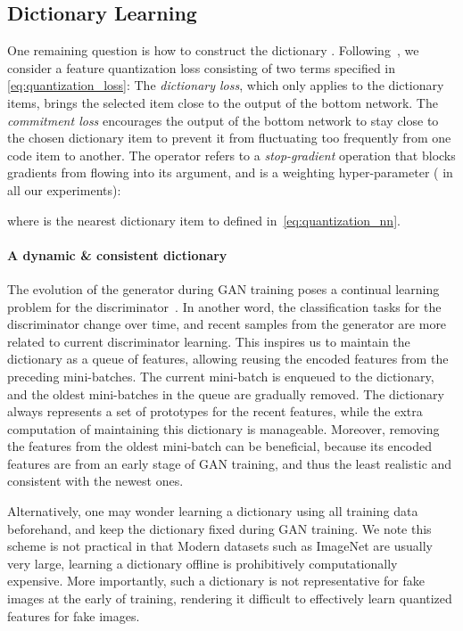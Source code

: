 \documentclass{article}
\begin{document}
\subsection{Dictionary Learning}
One remaining question is how to construct the dictionary . Following~\citep{van2017neural}, we consider a feature quantization loss consisting of two terms specified in \eqref{eq:quantization_loss}: 
 The {\it dictionary loss}, which only applies to the dictionary items, brings the selected item  close to the output of the bottom network. 
 The {\it commitment loss} encourages the output of the bottom network to stay close to the chosen dictionary item to prevent it from fluctuating too frequently from one code item to another. The operator  refers to a {\it stop-gradient} operation that blocks gradients from flowing into its argument, and  is a weighting hyper-parameter ( in all our experiments):

where  is the nearest dictionary item to  defined in~\eqref{eq:quantization_nn}. 

\paragraph{A dynamic \& consistent dictionary} The evolution of the generator during GAN training poses a continual learning problem for the discriminator~\cite{liang2018generative}. In another word, the classification tasks for the discriminator change over time, and recent samples from the generator are more related to current discriminator learning.
This inspires us to maintain the dictionary as a queue of features, allowing reusing the encoded features from the preceding mini-batches. The current mini-batch is enqueued to the dictionary, and the oldest mini-batches in the queue are gradually removed. The dictionary always represents a set of prototypes for the recent features, while the extra computation of maintaining this dictionary is manageable. Moreover, removing the features from the oldest mini-batch can be beneficial, because its encoded features are from an early stage of GAN training, and thus the least realistic and consistent with the newest ones. 

Alternatively, one may wonder learning a dictionary using all training data beforehand, and keep the dictionary fixed during GAN training. We note this scheme is not practical in that 
 Modern datasets such as ImageNet are usually very large, learning a dictionary offline is prohibitively computationally expensive.  
 More importantly, such a dictionary is not representative for fake images at the early of training, rendering it difficult to effectively learn quantized features for fake images.
\end{document}
